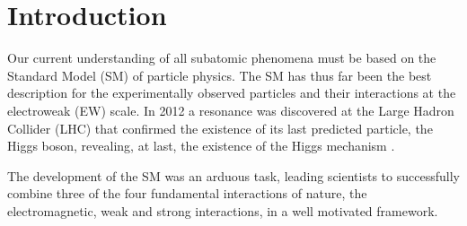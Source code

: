 
\newpage
% 

\renewcommand{\cleardoublepage}{}
\renewcommand{\clearpage}{}

\chapter{Introduction}
\label{Chap:Introduction}

Our current understanding of all subatomic phenomena must be based on the Standard Model (SM) of particle physics. 
%
The SM has thus far been the best description for the experimentally observed particles and their interactions at the electroweak (EW) scale. 
%
In 2012 a resonance was discovered at the Large Hadron Collider (LHC) that confirmed the existence of its last predicted particle, the Higgs boson, revealing, at last, the existence of the Higgs mechanism \cite{collaborations2016measurements}. 

The development of the SM was an arduous task, leading scientists to successfully combine three of the four fundamental interactions of nature, the electromagnetic, weak and strong interactions, in a well motivated framework. 

